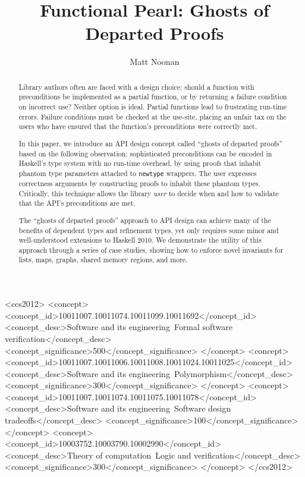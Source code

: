 \documentclass[format=sigplan, review=false, screen=true, 10pt]{acmart}
\begin{document}
\title[Ghosts of Departed Proofs]{Functional Pearl: Ghosts of Departed Proofs}

\author{Matt Noonan}


\begin{abstract}

  Library authors often are faced with a design choice: should a function with
  preconditions be implemented as a partial function, or by returning a failure
  condition on incorrect use? Neither option is ideal. Partial functions lead
  to frustrating run-time errors. Failure conditions must be checked
  at the use-site,
  placing an unfair tax on the users who have ensured that the function's
  preconditions were correctly met.
  
  In this paper, we introduce an API design concept called ``ghosts of departed
  proofs'' based on the following observation: sophisticated preconditions can be
  encoded in Haskell's type system with no run-time overhead, by using proofs
  that inhabit phantom type parameters attached to \texttt{newtype} wrappers.
  The user expresses correctness arguments by constructing proofs to inhabit
  these phantom types.
  Critically, this technique allows the
  library \emph{user} to decide when and how to validate that the API's preconditions
  are met.

  The ``ghosts of departed proofs'' approach to API design can achieve many of the benefits
  of dependent types and refinement types, yet only requires some minor and well-understood
  extensions to Haskell 2010. We demonstrate the utility of this approach
  through a series of case studies, showing how to enforce novel invariants for lists,
  maps, graphs, shared memory regions, and more.
\end{abstract}


%
%
 \begin{CCSXML}
<ccs2012>
<concept>
<concept_id>10011007.10011074.10011099.10011692</concept_id>
<concept_desc>Software and its engineering~Formal software verification</concept_desc>
<concept_significance>500</concept_significance>
</concept>
<concept>
<concept_id>10011007.10011006.10011008.10011024.10011025</concept_id>
<concept_desc>Software and its engineering~Polymorphism</concept_desc>
<concept_significance>300</concept_significance>
</concept>
<concept>
<concept_id>10011007.10011074.10011075.10011078</concept_id>
<concept_desc>Software and its engineering~Software design tradeoffs</concept_desc>
<concept_significance>100</concept_significance>
</concept>
<concept>
<concept_id>10003752.10003790.10002990</concept_id>
<concept_desc>Theory of computation~Logic and verification</concept_desc>
<concept_significance>300</concept_significance>
</concept>
</ccs2012>
\end{CCSXML}
\end{document}
